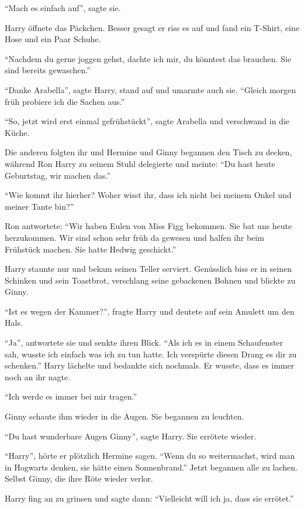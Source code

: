 \enquote{Mach es einfach auf}, sagte sie.

Harry öffnete das Päckchen. Besser gesagt er riss es auf und fand ein T-Shirt, eine Hose und ein Paar Schuhe.

\enquote{Nachdem du gerne joggen gehst, dachte ich mir, du könntest das brauchen. Sie sind bereits gewaschen.}

\enquote{Danke Arabella}, sagte Harry, stand auf und umarmte auch sie. \enquote{Gleich morgen früh probiere ich die Sachen aus.}

\enquote{So, jetzt wird erst einmal gefrühstückt}, sagte Arabella und verschwand in die Küche.

Die anderen folgten ihr und Hermine und Ginny begannen den Tisch zu decken, während Ron Harry zu seinem Stuhl delegierte und meinte: \enquote{Du hast heute Geburtstag, wir machen das.}

\enquote{Wie kommt ihr hierher? Woher wisst ihr, dass ich nicht bei meinem Onkel und meiner Tante bin?}

Ron antwortete: \enquote{Wir haben Eulen von Miss Figg bekommen. Sie bat uns heute herzukommen. Wir sind schon sehr früh da gewesen und halfen ihr beim Frühstück machen. Sie hatte Hedwig geschickt.}

Harry staunte nur und bekam seinen Teller serviert. Genüsslich biss er in seinen Schinken und sein Toastbrot, verschlang seine gebackenen Bohnen und blickte zu Ginny.

\enquote{Ist es wegen der Kammer?}, fragte Harry und deutete auf sein Amulett um den Hals.

\enquote{Ja}, antwortete sie und senkte ihren Blick. \enquote{Als ich es in einem Schaufenster sah, wusste ich einfach was ich zu tun hatte. Ich verspürte diesen Drang es dir zu schenken.} Harry lächelte und bedankte sich nochmals. Er wusste, dass es immer noch an ihr nagte.

\enquote{Ich werde es immer bei mir tragen.}

Ginny schaute ihm wieder in die Augen. Sie begannen zu leuchten.

\enquote{Du hast wunderbare Augen Ginny}, sagte Harry. Sie errötete wieder.

\enquote{Harry}, hörte er plötzlich Hermine sagen. \enquote{Wenn du so weitermachst, wird man in Hogwarts denken, sie hätte einen Sonnenbrand.} Jetzt begannen alle zu lachen. Selbst Ginny, die ihre Röte wieder verlor.

Harry fing an zu grinsen und sagte dann: \enquote{Vielleicht will ich ja, dass sie errötet.}

